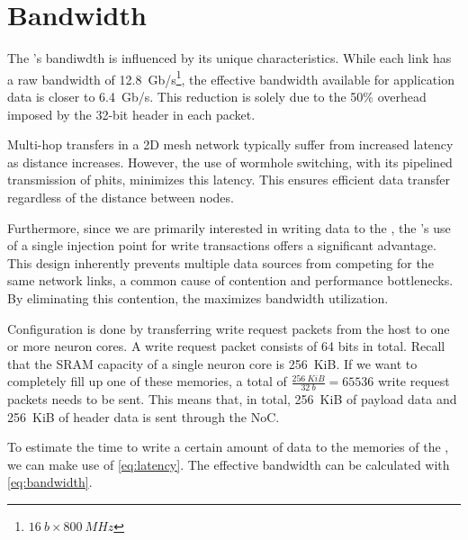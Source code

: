 \section{Bandwidth}
The \confignoc{}'s bandiwdth is influenced by its unique characteristics.
While each link has a raw bandwidth of \SI{12.8}{Gb/s}\footnote{$\SI{16}{b} \times \SI{800}{MHz}$}, the effective bandwidth available for application data is closer to \SI{6.4}{Gb/s}.
This reduction is solely due to the 50\% overhead imposed by the 32-bit header in each packet.

Multi-hop transfers in a 2D mesh network typically suffer from increased latency as distance increases.
However, the use of wormhole switching, with its pipelined transmission of phits, minimizes this latency.
This ensures efficient data transfer regardless of the distance between nodes.



Furthermore, since we are primarily interested in writing data to the \graicore{}, the \confignoc{}'s use of a single injection point for write transactions offers a significant advantage.
This design inherently prevents multiple data sources from competing for the same network links, a common cause of contention and performance bottlenecks.
By eliminating this contention, the \confignoc{} maximizes bandwidth utilization.

Configuration is done by transferring write request packets from the host to one or more neuron cores.
A write request packet consists of 64 bits in total.
Recall that the SRAM capacity of a single neuron core is \SI{256}{KiB}.
If we want to completely fill up one of these memories, a total of $\frac{\SI{256}{KiB}}{\SI{32}{b}} = 65536$ write request packets needs to be sent.
This means that, in total, \SI{256}{KiB} of payload data and \SI{256}{KiB} of header data is sent through the NoC.

To estimate the time to write a certain amount of data to the memories of the \graicore{}, we can make use of \cref{eq:latency}.
The effective bandwidth can be calculated with \cref{eq:bandwidth}.


